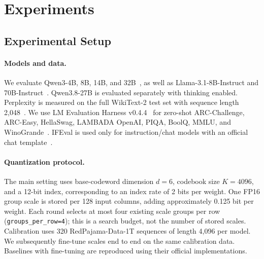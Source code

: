 \section{Experiments}

\subsection{Experimental Setup}

\paragraph{Models and data.} We evaluate Qwen3-4B, 8B, 14B, and 32B~\cite{qwen3}, as well as Llama-3.1-8B-Instruct and 70B-Instruct~\cite{llama3}. Qwen3.8-27B is evaluated separately with thinking enabled. Perplexity is measured on the full WikiText-2 test set with sequence length 2,048~\cite{wikitext}.
We use LM Evaluation Harness v0.4.4~\cite{lmeval} for zero-shot ARC-Challenge, ARC-Easy, HellaSwag, LAMBADA OpenAI, PIQA, BoolQ, MMLU, and WinoGrande~\cite{arc,hellaswag,lambada,piqa,boolq,mmlu,winogrande}. IFEval is used only for instruction/chat models with an official chat template~\cite{ifeval}.

\paragraph{Quantization protocol.} The main setting uses base-codeword dimension $d=6$, codebook size $K=4096$, and a 12-bit index, corresponding to an index rate of 2 bits per weight. One FP16 group scale is stored per 128 input columns, adding approximately 0.125 bit per weight.
Each round selects at most four existing scale groups per row (\texttt{groups\_per\_row=4}); this is a search budget, not the number of stored scales.
Calibration uses 320 RedPajama-Data-1T sequences of length 4,096 per model. We subsequently fine-tune scales end to end on the same calibration data. Baselines with fine-tuning are reproduced using their official implementations.

